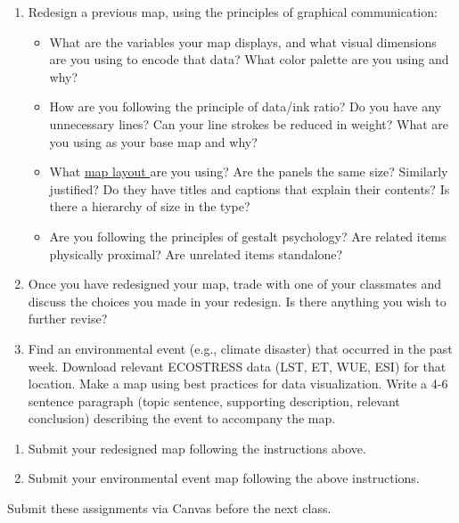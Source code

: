 \documentclass[oneside,a4paper,11pt,explicit]{book}
\begin{document}
\begin{enumerate}
    \item Redesign a previous map, using the principles of graphical communication:
	\begin{itemize}
		\item What are the variables your map displays, and what visual dimensions are you using to encode that data? What color palette are you using and why?
		\item How are you following the principle of data/ink ratio? Do you have any unnecessary lines? Can your line strokes be reduced in weight? What are you using as your base map and why?
		\item What \href{https://en.wikipedia.org/wiki/Map_layout}{map layout }are you using? Are the panels the same size? Similarly justified? Do they have titles and captions that explain their contents? Is there a hierarchy of size in the type?
		\item Are you following the principles of gestalt psychology? Are related items physically proximal? Are unrelated items standalone?
        \end{itemize}
    \item Once you have redesigned your map, trade with one of your classmates and discuss the choices you made in your redesign. Is there anything you wish to further revise? 
    \item Find an environmental event (e.g., climate disaster) that occurred in the past week. Download relevant ECOSTRESS data (LST, ET, WUE, ESI) for that location. Make a map using best practices for data visualization. Write a 4-6 sentence paragraph (topic sentence, supporting description, relevant conclusion) describing the event to accompany the map.
\end{enumerate}

\begin{tcolorbox}[colback=yellow!5!white,colframe=IceCreamOrbit,title= \vspace{.2em} \Large Map of the Week Assignments]
	\large
	\begin{enumerate}
		\item Submit your redesigned map following the instructions above. 
		\item Submit your environmental event map following the above instructions. 
	\end{enumerate}
	Submit these assignments via Canvas before the next class.
\end{tcolorbox}
\end{document}
